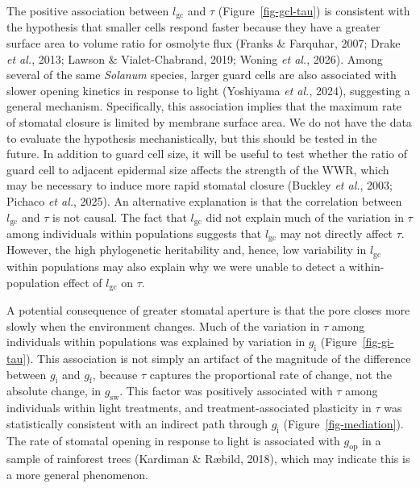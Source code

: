 \documentclass[
  letterpaper,
  DIV=11,
  numbers=noendperiod]{scrartcl}
\newcommand{\gcl}{$l_\mathrm{gc}$}
\newcommand{\gi}{$g_\mathrm{i}$}
\newcommand{\gf}{$g_\mathrm{f}$}
\newcommand{\gop}{$g_\mathrm{op}$}
\newcommand{\gsw}{$g_\mathrm{sw}$}
\begin{document}
The positive association between \gcl{} and \(\tau\)
(Figure~\ref{fig-gcl-tau}) is consistent with the hypothesis that
smaller cells respond faster because they have a greater surface area to
volume ratio for osmolyte flux (Franks \& Farquhar, 2007; Drake \emph{et
al.}, 2013; Lawson \& Vialet-Chabrand, 2019; Woning \emph{et al.},
2026). Among several of the same \emph{Solanum} species, larger guard
cells are also associated with slower opening kinetics in response to
light (Yoshiyama \emph{et al.}, 2024), suggesting a general mechanism.
Specifically, this association implies that the maximum rate of stomatal
closure is limited by membrane surface area. We do not have the data to
evaluate the hypothesis mechanistically, but this should be tested in
the future. In addition to guard cell size, it will be useful to test
whether the ratio of guard cell to adjacent epidermal size affects the
strength of the WWR, which may be necessary to induce more rapid
stomatal closure (Buckley \emph{et al.}, 2003; Pichaco \emph{et al.},
2025). An alternative explanation is that the correlation between \gcl{}
and \(\tau\) is not causal. The fact that \gcl{} did not explain much of
the variation in \(\tau\) among individuals within populations suggests
that \gcl{} may not directly affect \(\tau\). However, the high
phylogenetic heritability and, hence, low variability in \gcl{} within
populations may also explain why we were unable to detect a
within-population effect of \gcl{} on \(\tau\).

A potential consequence of greater stomatal aperture is that the pore
closes more slowly when the environment changes. Much of the variation
in \(\tau\) among individuals within populations was explained by
variation in \gi{} (Figure~\ref{fig-gi-tau}). This association is not
simply an artifact of the magnitude of the difference between \gi{} and
\gf{}, because \(\tau\) captures the proportional rate of change, not
the absolute change, in \gsw. This factor was positively associated with
\(\tau\) among individuals within light treatments, and
treatment-associated plasticity in \(\tau\) was statistically consistent
with an indirect path through \gi{} (Figure~\ref{fig-mediation}). The
rate of stomatal opening in response to light is associated with \gop{}
in a sample of rainforest trees (Kardiman \& Ræbild, 2018), which may
indicate this is a more general phenomenon.
\end{document}
